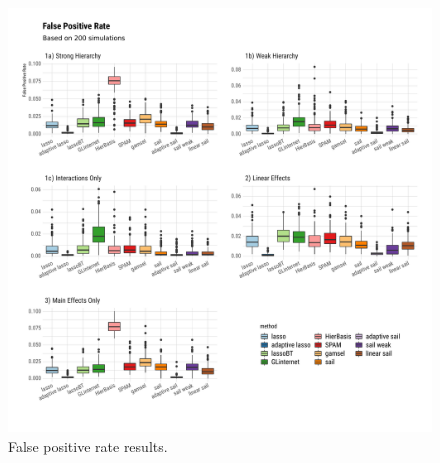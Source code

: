 \documentclass[12pt,letter]{article}\usepackage[]{graphicx}\usepackage[]{color}
\newenvironment{knitrout}{}{} %
\begin{document}
\begin{knitrout}\scriptsize
{}\color{fgcolor}\begin{figure}[H]

{\centering \includegraphics[width=1\linewidth]{figure/plot-fpr-sim-1} 

}

\caption[False positive rate results]{False positive rate results.}\label{fig:plot-fpr-sim}
\end{figure}


\end{knitrout}
\end{document}
